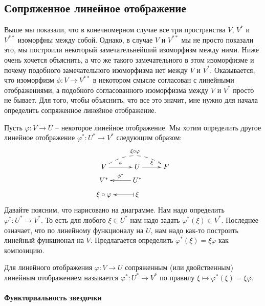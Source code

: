 \subsection{Сопряженное линейное отображение}

Выше мы показали, что в конечномерном случае все три пространства $V$, $V^*$ и $V^{**}$ изоморфны между собой.
Однако, в случае $V$ и $V^{**}$ мы не просто показали это, мы построили некоторый замечательнейший изоморфизм между ними.
Ниже очень хочется объяснить, а что же такого замечательного в этом изоморфизме и почему подобного замечательного изоморфизма нет между $V$ и $V^*$.
Оказывается, что изоморфизм $\phi\colon V \to V^{**}$ в некотором смысле согласован с линейными отображениями, а подобного согласованного изоморфизма между $V$ и $V^*$ просто не бывает.
Для того, чтобы объяснить, что все это значит, мне нужно для начала определить сопряженное линейное отображение.

Пусть $\varphi\colon V\to U$ -- некоторое линейное отображение.
Мы хотим определить другое линейное отображение $\varphi^* \colon U^*\to V^*$ следующим образом:
\[
\xymatrix@R=6pt{
	{V}\ar[r]^{\varphi}\ar@{-->}@/^16pt/[rr]^{\xi\circ \varphi}&{U}\ar[r]^{\xi}&{F}\\
	{V^*}&{U^*}\ar[l]_{\phi^*}&{}\\
	{\xi\circ \varphi}&{\xi}\ar@{|->}[l]&{}\\
}
\]
Давайте поясним, что нарисовано на диаграмме.
Нам надо определить $\varphi^*\colon U^*\to V^*$.
То есть для любого $\xi\in U^*$ нам надо задать $\varphi^*(\xi)\in V^*$.
Последнее означает, что по линейному функционалу на $U$, нам надо как-то построить линейный функционал на $V$.
Предлагается определить $\varphi^*(\xi) = \xi \varphi$ как композицию.

\begin{definition}
Для линейного отображения $\varphi\colon V\to U$ сопряженным (или двойственным) линейным отображением называется $\varphi^*\colon U^*\to V^*$ по правилу $\xi \mapsto \varphi^*(\xi) = \xi \varphi$.
\end{definition}

\paragraph{Функториальность звездочки}

